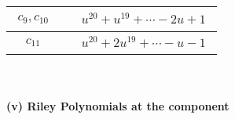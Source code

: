 \documentclass[1p]{elsarticle_modified}
\theoremstyle{definition}
\begin{document}
\begin{tabular}{m{50pt}|m{274pt}}
\hline $$\begin{aligned}c_{9},c_{10}\end{aligned}$$&$\begin{aligned}
&u^{20}+u^{19}+\cdots-2 u+1
\end{aligned}$\\
\hline $$\begin{aligned}c_{11}\end{aligned}$$&$\begin{aligned}
&u^{20}+2 u^{19}+\cdots- u-1
\end{aligned}$\\
\hline
\end{tabular}\\~\\
\newpage\renewcommand{\arraystretch}{1}
\flushleft \textbf{(v) Riley Polynomials at the component}\newline \\
\end{document}
